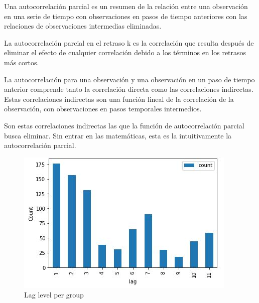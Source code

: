 Una autocorrelaci\'on parcial es un resumen de la relaci\'on entre una observaci\'on en una serie de tiempo con observaciones en pasos de tiempo anteriores con las relaciones de observaciones intermedias eliminadas.

La autocorrelaci\'on parcial en el retraso k es la correlaci\'on que resulta despu\'es de eliminar el efecto de cualquier correlaci\'on debido a los t\'erminos en los retrasos m\'as cortos.

La autocorrelaci\'on para una observaci\'on y una observaci\'on en un paso de tiempo anterior comprende tanto la correlaci\'on directa como las correlaciones indirectas. Estas correlaciones indirectas son una funci\'on lineal de la correlaci\'on de la observaci\'on, con observaciones en pasos temporales intermedios.

Son estas correlaciones indirectas las que la funci\'on de autocorrelaci\'on parcial busca eliminar. Sin entrar en las matem\'aticas, esta es la intuitivamente la autocorrelaci\'on parcial.

\begin{figure}[h!]
	\centering
	\includegraphics[width=0.8\linewidth]{Figure/Data_PartialAutocorrelation.JPG}
	\caption{Lag level per group} 
	\label{fig:LagLevel}
\end{figure}

